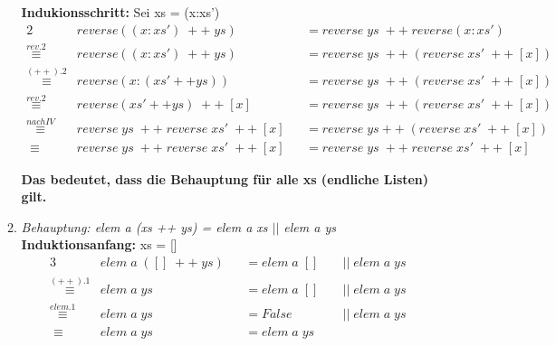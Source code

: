 \documentclass[11pt]{article}
\begin{document}
\begin{enumerate}
\begin{enumerate}
\vspace*{0.5cm}
\textbf{Indukionsschritt:} Sei xs = (x:xs')
\begin{alignat*}{2}
&reverse((x:xs')\phantom{.}++\phantom{.}ys) &&= reverse\phantom{.}ys \phantom{.}++\phantom{.}reverse(x:xs')\\
\stackrel{rev.2}{\equiv} &reverse((x:xs')\phantom{.}++\phantom{.}ys) &&= reverse \phantom{.} ys\phantom{.}++\phantom{.}(reverse\phantom{.}xs'\phantom{.}++\phantom{.}[x])\\
\stackrel{(++).2}{\equiv} &reverse(x:(xs'++ys)) &&= reverse\phantom{.}ys\phantom{.}++\phantom{.}(reverse\phantom{.}xs'\phantom{.}++\phantom{.}[x])\\
\stackrel{rev.2}{\equiv}&reverse(xs'++ys)\phantom{.}++\phantom{.}[x]&&=reverse\phantom{.}ys\phantom{.}++\phantom{.}(reverse\phantom{.}xs'\phantom{.}++\phantom{.}[x])\\
\stackrel{nach IV}{\equiv} &reverse\phantom{.}ys\phantom{.}++\phantom{.}reverse\phantom{.}xs'\phantom{.}++\phantom{.}[x] &&= reverse\phantom{.}ys++\phantom{.}(reverse\phantom{.}xs'\phantom{.}++\phantom{.}[x])\\
\equiv \phantom{.}&reverse\phantom{.}ys\phantom{.}++\phantom{.}reverse\phantom{.}xs'\phantom{.}++\phantom{.}[x] &&= reverse\phantom{.}ys\phantom{.}++\phantom{.}reverse\phantom{.}xs'\phantom{.}++\phantom{.}[x]
\end{alignat*}


\vspace*{0.5cm}
\textbf{Das bedeutet, dass die Behauptung für alle xs (endliche Listen) gilt.}

\vspace*{0.5cm}
\item
\textit{Behauptung: elem a (xs ++ ys) = elem a xs $||$ elem a ys}\\
\textbf{Induktionsanfang:} xs = []
\begin{alignat*}{3}
&elem\phantom{.}a\phantom{.}([]\phantom{.}++\phantom{.}ys) &&= elem\phantom{.}a\phantom{.}[]\phantom{.}&&||\phantom{.}elem\phantom{.}a\phantom{.}ys\\
\stackrel{(++).1}{\equiv}&elem\phantom{.}a\phantom{.}ys &&= elem\phantom{.}a\phantom{.}[]\phantom{.}&&||\phantom{.}elem\phantom{.}a\phantom{.}ys\\
\stackrel{elem.1}{\equiv}&elem\phantom{.}a\phantom{.}ys&&=False\phantom{.}&&||\phantom{.}elem\phantom{.}a\phantom{.}ys\\
\equiv \phantom{.}&elem\phantom{.}a\phantom{.}ys&&=elem\phantom{.}a\phantom{.}ys &&\
\end{alignat*}



\end{enumerate}
\end{enumerate}
\end{document}
